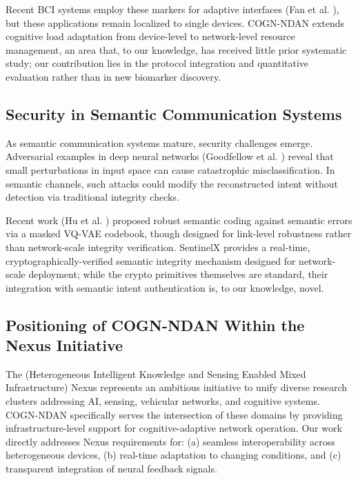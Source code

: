 \documentclass{BVP_CINC}
\newcommand{\COGN}{COGN-NDAN}
\begin{document}
Recent BCI systems employ these markers for adaptive interfaces (Fan et al. \cite{fan2022eegtnet}), but these applications remain localized to single devices. \COGN{} extends cognitive load adaptation from device-level to network-level resource management, an area that, to our knowledge, has received little prior systematic study; our contribution lies in the protocol integration and quantitative evaluation rather than in new biomarker discovery.

\subsection{Security in Semantic Communication Systems}
As semantic communication systems mature, security challenges emerge. Adversarial examples in deep neural networks (Goodfellow et al. \cite{goodfellow2014explaining}) reveal that small perturbations in input space can cause catastrophic misclassification. In semantic channels, such attacks could modify the reconstructed intent without detection via traditional integrity checks.

Recent work (Hu et al. \cite{hu2023robust}) proposed robust semantic coding against semantic errors via a masked VQ-VAE codebook, though designed for link-level robustness rather than network-scale integrity verification. SentinelX provides a real-time, cryptographically-verified semantic integrity mechanism designed for network-scale deployment; while the crypto primitives themselves are standard, their integration with semantic intent authentication is, to our knowledge, novel.

\subsection{Positioning of \COGN{} Within the Nexus Initiative}
The (Heterogeneous Intelligent Knowledge and Sensing Enabled Mixed Infrastructure) Nexus represents an ambitious initiative to unify diverse research clusters addressing AI, sensing, vehicular networks, and cognitive systems. \COGN{} specifically serves the intersection of these domains by providing infrastructure-level support for cognitive-adaptive network operation. Our work directly addresses Nexus requirements for: (a) seamless interoperability across heterogeneous devices, (b) real-time adaptation to changing conditions, and (c) transparent integration of neural feedback signals.
\end{document}

